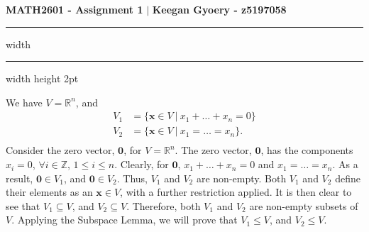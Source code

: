 \documentclass[a4paper,11pt]{article}
\newcommand{\ds}{\displaystyle}
\begin{document}
\begin{center}
	\LARGE \textbf{MATH2601 - Assignment 1 }$\vert$\textbf{ Keegan Gyoery - z5197058}
	\vspace{2mm}
	\hrule width \hsize \kern 1mm \hrule width \hsize height 2pt 
\end{center}



We have $\ds{V = \mathbb{R}^n}$, and
	\begin{align*}
		V_1 & = \{\mathbf{x} \in V \:|\: x_1 + \dots + x_n = 0\}\\
		V_2 & = \{\mathbf{x} \in V \:|\: x_1 = \dots = x_n\}.\\
	\end{align*}
Consider the zero vector, $\ds{\mathbf{0}}$, for $\ds{V = \mathbb{R}^n}$. The zero vector, $\ds{\mathbf{0}}$, has the components $\ds{x_i = 0}$, $\ds{\forall i \in \mathbb{Z}}$, $\ds{1 \leq i \leq n}$. Clearly, for $\ds{\mathbf{0}}$, $\ds{x_1 + \dots + x_n = 0}$ and $\ds{x_1 = \dots = x_n}$. As a result, $\ds{\mathbf{0} \in V_1}$, and $\ds{\mathbf{0} \in V_2}$. Thus, $\ds{V_1}$ and $\ds{V_2}$ are non-empty. Both $\ds{V_1}$ and $\ds{V_2}$ define their elements as an $\ds{\mathbf{x} \in V}$, with a further restriction applied. It is then clear to see that $\ds{V_1 \subseteq V}$, and $\ds{V_2 \subseteq V}$. Therefore, both $\ds{V_1}$ and $\ds{V_2}$ are non-empty subsets of $\ds{V}$. Applying the Subspace Lemma, we will prove that $\ds{V_1 \leq V}$, and $\ds{V_2 \leq V}$. 
\end{document}
